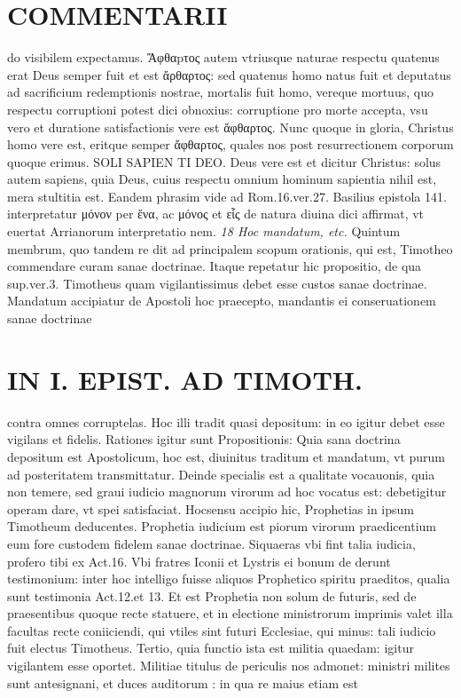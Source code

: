\documentclass{article}
\begin{document}
\begin{pages}
\section*{COMMENTARII }
\marginpar{[ p.36 ]}\pstart do visibilem expectamus. Ἄφθαpτος autem vtriusque naturae respectu quatenus erat Deus semper fuit et est ἄρθαρτος: sed quatenus homo natus fuit et deputatus ad sacrificium redemptionis nostrae, mortalis fuit homo, vereque mortuus, quo respectu corruptioni potest dici obnoxius: corruptione pro morte accepta, vsu vero et duratione satisfactionis vere est ἄφθαρτος. Nunc quoque in gloria, Christus homo vere est, eritque semper ἄφθαρτος, quales nos post resurrectionem corporum quoque erimus. SOLI SAPIEN TI DEO. Deus vere est et dicitur Christus: solus autem sapiens, quia Deus, cuius respectu omnium  hominum sapientia nihil est, mera stultitia est. Eandem phrasim vide ad Rom.16.ver.27. Basilius epistola 141. interpretatur μόνον per ἕνα, ac μόνος et εἷς  de natura diuina dici affirmat, vt euertat Arrianorum interpretatio nem.  \pend
\textit{18 Hoc mandatum, etc. }\pstart Quintum membrum, quo tandem re dit ad principalem scopum orationis, qui est, Timotheo commendare curam sanae doctrinae. Itaque repetatur hic propositio, de qua sup.ver.3. Timotheus quam vigilantissimus debet esse custos sanae doctrinae. Mandatum accipiatur de Apostoli hoc praecepto, mandantis ei conseruationem sanae doctrinae  \pend
\section*{IN I. EPIST. AD TIMOTH. }
\marginpar{[ p.39 ]}\pstart contra omnes corruptelas. Hoc illi tradit quasi depositum: in eo igitur debet esse vigilans et fidelis. Rationes igitur sunt Propositionis: Quia sana doctrina depositum est Apostolicum, hoc est, diuinitus traditum et mandatum, vt purum ad posteritatem transmittatur. Deinde specialis est a qualitate vocauonis, quia non temere, sed graui iudicio magnorum virorum ad hoc vocatus est: debetigitur operam dare, vt spei satisfaciat. Hocsensu accipio hic, Prophetias in ipsum Timotheum deducentes. Prophetia iudicium est piorum virorum praedicentium eum fore custodem fidelem sanae doctrinae.  \pend\pstart Siquaeras vbi fint talia iudicia, profero tibi ex Act.16. Vbi fratres Iconii et Lystris ei bonum de derunt testimonium: inter hoc intelligo fuisse aliquos Prophetico spiritu praeditos, qualia sunt testimonia Act.12.et 13. Et est Prophetia non solum de futuris, sed de praesentibus quoque recte statuere, et in electione ministrorum imprimis valet illa facultas recte coniiciendi, qui vtiles sint futuri Ecclesiae, qui minus: tali iudicio fuit electus Timotheus. Tertio, quia functio ista est militia quaedam: igitur vigilantem esse oportet. Militiae titulus de periculis nos admonet: ministri milites sunt antesignani, et duces auditorum : in qua re maius etiam est  \pend

\end{pages}
\end{document}

